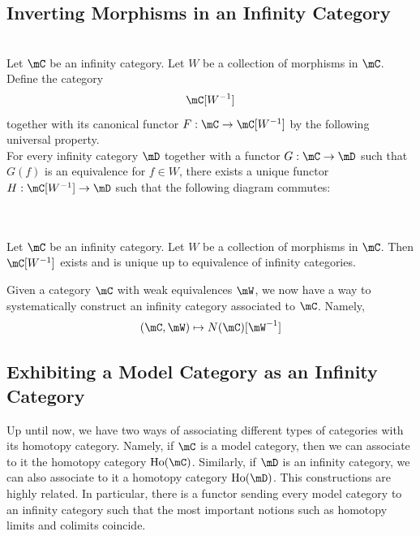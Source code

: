 \documentclass[a4paper]{article}
\begin{document}
\subsection{Inverting Morphisms in an Infinity Category}
\begin{defn}{}{}\\ Let $\mC$ be an infinity category. Let $W$ be a collection of morphisms in $\mC$. Define the category $$\mC[W^{-1}]$$ together with its canonical functor $F:\mC\to\mC[W^{-1}]$ by the following universal property. \\

For every infinity category $\mD$ together with a functor $G:\mC\to\mD$ such that $G(f)$ is an equivalence for $f\in W$, there exists a unique functor $H:\mC[W^{-1}]\to\mD$ such that the following diagram commutes: \\
\\
\end{defn}

\begin{prp}{}{}\\ Let $\mC$ be an infinity category. Let $W$ be a collection of morphisms in $\mC$. Then $\mC[W^{-1}]$ exists and is unique up to equivalence of infinity categories. 
\end{prp}

Given a category $\mC$ with weak equivalences $\mW$, we now have a way to systematically construct an infinity category associated to $\mC$. Namely, $$(\mC,\mW)\mapsto N(\mC)[\mW^{-1}]$$

\subsection{Exhibiting a Model Category as an Infinity Category}
Up until now, we have two ways of associating different types of categories with its homotopy category. Namely, if $\mC$ is a model category, then we can associate to it the homotopy category $\text{Ho}(\mC)$. Similarly, if $\mD$ is an infinity category, we can also associate to it a homotopy category $\text{Ho}(\mD)$. This constructions are highly related. In particular, there is a functor sending every model category to an infinity category such that the most important notions such as homotopy limits and colimits coincide. \\
\end{document}
